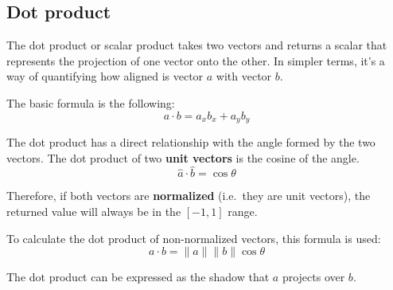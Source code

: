\documentclass{article}
\begin{document}
\subsection{Dot product}

The dot product or scalar product takes two vectors and returns a scalar that
represents the projection of one vector onto the other. In simpler terms, it's a
way of quantifying how aligned is vector $a$ with vector $b$.

The basic formula is the following:
\begin{equation*}
  a \cdot b = a_x b_x + a_y b_y
\end{equation*}

The dot product has a direct relationship with the angle formed by the two
vectors. The dot product of two \textbf{unit vectors} is the cosine of the
angle.
\begin{equation*}
  \hat{a} \cdot \hat{b} = \cos \theta
\end{equation*}

Therefore, if both vectors are \textbf{normalized} (i.e.~they are unit
vectors), the returned value will always be in the $[-1,1]$ range.

To calculate the dot product of non-normalized vectors, this formula is used:
\begin{equation*}
  a \cdot b = \|a\| \|b\| \cos \theta
\end{equation*}

The dot product can be expressed as the shadow that $a$ projects over $b$.
\end{document}
